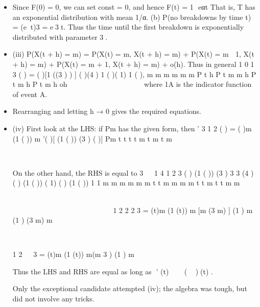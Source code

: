 \documentclass[a4paper,12pt]{article}
\begin{document}
\begin{itemize}
\item Since F(0) = 0, we can set const = 0, and hence F(t) = 1  eαt
That is, T has an exponential distribution with mean 1/α.
(b) P(no breakdowns by time t) = (et)3 = e3t. Thus the time until the
first breakdown is exponentially distributed with parameter 3.
\item (iii) P(X(t + h) = m) = P(X(t) = m, X(t + h) = m) + P(X(t) = m  1, X(t + h) = m)
+ P(X(t) = m + 1, X(t + h) = m) + o(h).
Thus in general
1 0
1 3
( ) = ( )[1 ((3 ) ) ] ( )(4 ) 1
( )( 1) 1 ( ),
m m m m
m m
P t h P t m m h P t m h
P t m h oh
 
 
        
   
where 1A is the indicator function of event A.
\item Rearranging and letting h → 0 gives the required equations.
\item (iv) First look at the LHS: if Pm has the given form, then
’ 3 1 2
( ) = ( )m (1 ( )) m ’( )[ (1 ( )) (3 ) ( )]
Pm t t t t m t m t
m
   

 	  	 	  	   	
 

On the other hand, the RHS is equal to
3  
1 4 1 2
3
( ) (1 ( )) (3 )
3 3
(4 ) ( ) (1 ( )) ( 1) ( ) (1 ( ))
1 1
m m
m m m m
t t m m
m
m t t m t t
m m

   
 
 	      

 
   
  	      	   
   
  
  1 2 2 2 3
= (t)m (1 (t)) m [m (3 m) ] (1 ) m (1 ) (3 m)
m
   

 	  	     	  	    	   	
 

1 2   3
= (t)m (1 (t)) m(m 3 ) (1 )
m
   
         
	 

Thus the LHS and RHS are equal as long as ’ (t)    ( )(t) .

Only the exceptional candidate attempted (iv); the algebra was tough, but did not involve any tricks.
\end{itemize}
\end{document}
